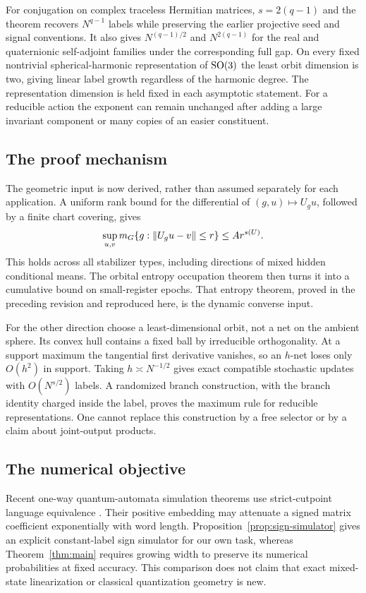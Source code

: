 For conjugation on complex traceless Hermitian matrices,
$s=2(q-1)$ and the theorem recovers $N^{q-1}$ labels while preserving
the earlier projective seed and signal conventions. It also gives
$N^{(q-1)/2}$ and $N^{2(q-1)}$ for the real and quaternionic
self-adjoint families under the corresponding full gap. On every
fixed nontrivial spherical-harmonic representation of $\operatorname{SO}(3)$ the
least orbit dimension is two, giving linear label growth regardless
of the harmonic degree. The representation dimension is held fixed
in each asymptotic statement. For a reducible action the exponent
can remain unchanged after adding a large invariant component or
many copies of an easier constituent.

\subsection{The proof mechanism}
The geometric input is now derived, rather than assumed separately
for each application. A uniform rank bound for the differential of
$(g,u)\mapsto U_gu$, followed by a finite chart covering, gives
\[
 \sup_{u,v}m_G\{g:\lVert U_gu-v\rVert\le r\}\le A r^{s(U)}.
\]
This holds across all stabilizer types, including directions of mixed
hidden conditional means. The orbital entropy occupation theorem
then turns it into a cumulative bound on small-register epochs.
That entropy theorem, proved in the preceding revision and reproduced
here, is the dynamic converse input.

For the other direction choose a least-dimensional orbit, not a net
on the ambient sphere. Its convex hull contains a fixed ball by
irreducible orthogonality. At a support maximum the tangential first
derivative vanishes, so an $h$-net loses only $O(h^2)$ in support.
Taking $h\asymp N^{-1/2}$ gives exact compatible stochastic updates
with $O(N^{s/2})$ labels. A randomized branch construction, with the
branch identity charged inside the label, proves the maximum rule
for reducible representations. One cannot replace this construction
by a free selector or by a claim about joint-output products.

\subsection{The numerical objective}
Recent one-way quantum-automata simulation theorems use
strict-cutpoint language equivalence \cite{CWapr,CWmay,ChenSep}.
Their positive embedding may attenuate a signed matrix coefficient
exponentially with word length. Proposition~\ref{prop:sign-simulator}
gives an explicit constant-label sign simulator for our own task,
whereas Theorem~\ref{thm:main} requires growing width to preserve
its numerical probabilities at fixed accuracy. This comparison does
not claim that exact mixed-state linearization or classical
quantization geometry is new.

